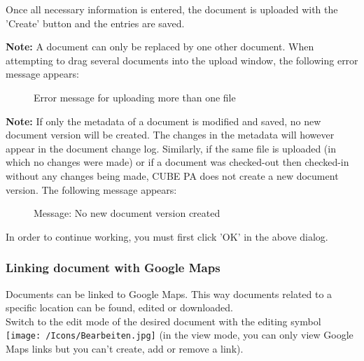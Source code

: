 Once all necessary information is entered, the document is uploaded with the 'Create' button  and the entries are saved. \newline

\textbf{Note:} A document can only be replaced by one other document. When attempting to drag several documents into the upload window, the following error message appears:

\begin{figure}[H]
\caption{Error message for uploading more than one file}
\end{figure}

\textbf{Note:} If only the metadata of a document is modified and saved, no new document version will be created. The changes in the metadata will however appear in the document change log. Similarly, if the same file is uploaded (in which no changes were made) or if a document was checked-out then checked-in without any changes being made, CUBE PA does not create a new document version. The following message appears:

\begin{figure}[H]
\caption{Message: No new document version created}
\end{figure}

In order to continue working, you must first click 'OK' in the above dialog.

\subsubsection{Linking document with Google Maps}
\label{bkm:Ref442545553}
Documents can be linked to Google Maps. This way documents related to a specific location can be found, edited or downloaded. \\
Switch to the edit mode of the desired document with the editing symbol \texttt{[image: /Icons/Bearbeiten.jpg]} (in the view mode, you can only view Google Maps links but you can't create, add or remove a link).

